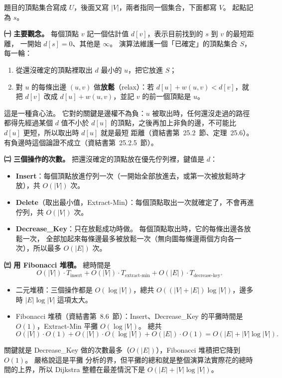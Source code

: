 \begin{pastsoln}
題目的頂點集合寫成 $U$，後面又寫 $|V|$，兩者指同一個集合，下面都寫 $V$。 起點記為 $s$。

\textbf{㈠ 主要觀念。} 每個頂點 $v$ 記一個估計值 $d[v]$，表示目前找到的 $s$ 到 $v$ 的最短距離，
一開始 $d[s] = 0$、其他是 $\infty$。 演算法維護一個「已確定」的頂點集合 $S$，每一輪：
\begin{enumerate}
\item 從還沒確定的頂點裡取出 $d$ 最小的 $u$，把它放進 $S$；
\item 對 $u$ 的每條出邊 $(u, v)$ 做\textbf{放鬆}（relax）：若 $d[u] + w(u,v) < d[v]$，就把
$d[v]$ 改成 $d[u] + w(u,v)$，並記 $v$ 的前一個頂點是 $u$。
\end{enumerate}
這是一種貪心法。 它對的關鍵是邊權不為負：$u$ 被取出時，任何還沒走過的路徑都得先經過某個 $d$
值不小於 $d[u]$ 的頂點，之後再加上非負的邊，不可能比 $d[u]$ 更短，所以取出時 $d[u]$ 就是最短
距離（資結書第~25.2~節、定理~25.6）。 有負邊時這個論證不成立（資結書第~25.2.5~節）。

\textbf{㈡ 三個操作的次數。} 把還沒確定的頂點放在優先佇列裡，鍵值是 $d$：
\begin{itemize}
\item \textbf{Insert}：每個頂點放進佇列一次（一開始全部放進去，或第一次被放鬆時才放），共
$O(|V|)$ 次。
\item \textbf{Delete}（取出最小值，Extract-Min）：每個頂點取出一次就確定了，不會再進佇列，共
$O(|V|)$ 次。
\item \textbf{Decrease\_Key}：只在放鬆成功時做。 每個頂點取出時，它的每條出邊各放鬆一次，
全部加起來每條邊最多被放鬆一次（無向圖每條邊兩個方向各一次），所以最多 $O(|E|)$ 次。
\end{itemize}

\textbf{㈢ 用 Fibonacci 堆積。} 總時間是
\[
O(|V|) \cdot T_{\text{insert}} + O(|V|) \cdot T_{\text{extract-min}} + O(|E|) \cdot T_{\text{decrease-key}}.
\]
\begin{itemize}
\item 二元堆積：三個操作都是 $O(\log|V|)$，總共 $O((|V| + |E|)\log|V|)$，邊多時 $|E|\log|V|$ 這項太大。
\item Fibonacci 堆積（資結書第~8.6~節）：Insert、Decrease\_Key 的平攤時間是 $O(1)$，Extract-Min
平攤 $O(\log|V|)$。 總共
\[
O(|V|) \cdot O(1) + O(|V|) \cdot O(\log|V|) + O(|E|) \cdot O(1) = O(|E| + |V| \log |V|).
\]
\end{itemize}
關鍵就是 Decrease\_Key 做的次數最多（$O(|E|)$），Fibonacci 堆積把它降到 $O(1)$。 嚴格說這是平攤
分析的界，但平攤的總和就是整個演算法實際花的總時間的上界，所以 Dijkstra 整體在最差情況下是
$O(|E| + |V|\log|V|)$。
\end{pastsoln}
